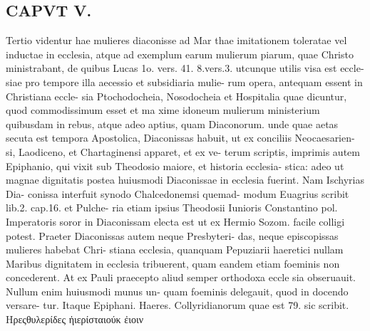 \documentclass{article}
\begin{document}
\begin{pages}
\section*{CAPVT  V. }
\marginpar{[ p.273 ]}Tertio videntur hae mulieres diaconisse ad Mar thae imitationem toleratae vel inductae in ecclesia, atque ad exemplum earum mulierum piarum, quae Christo ministrabant, de quibus Lucas 1o. vers. 41. 8.vers.3. utcunque utilis visa est eccle- siae pro tempore illa aecessio et subsidiaria mulie- rum opera, antequam essent in Christiana eccle- sia Ptochodocheia, Nosodocheia et Hospitalia quae dicuntur, quod commodissimum esset et ma xime idoneum mulierum ministerium quibusdam in rebus, atque adeo aptius, quam Diaconorum. unde quae aetas secuta est tempora Apostolica, Diaconissas habuit, ut ex conciliis Neocaesarien- si, Laodiceno, et Chartaginensi apparet, et ex ve- terum scriptis, imprimis autem Epiphanio, qui vixit sub Theodosio maiore, et historia ecclesia- stica: adeo ut magnae dignitatis postea huiusmodi Diaconissae in ecclesia fuerint. Nam Ischyrias Dia- conissa interfuit synodo Chalcedonemsi quemad- modum Euagrius scribit lib.2. cap.16. et Pulche- ria etiam ipsius Theodosii Iunioris Constantino pol. Imperatoris soror in Diaconissam electa est ut ex Hermio Sozom. facile colligi potest. Praeter Diaconissas autem neque Presbyteri- das, neque episcopissas mulieres habebat Chri- stiana ecclesia, quanquam Pepuziarii haeretici nullam Maribus dignitatem in ecclesia tribuerent, quam eandem etiam foeminis non concederent. At ex Pauli praecepto aliud semper orthodoxa eccle sia obseruauit. Nullum enim huiusmodi munus un- quam foeminis delegauit, quod in docendo versare- tur. Itaque Epiphani. Haeres. Collyridianorum quae est 79. sic scribit. Hρεςθυλερίδες ἠιερίσταιούκ ἐιοιν 

\end{pages}
\end{document}
